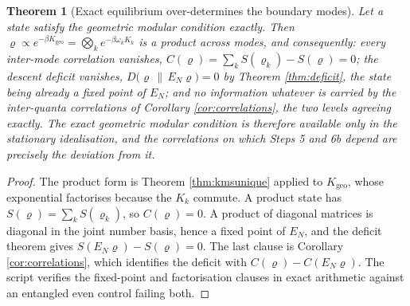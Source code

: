 \documentclass[11pt]{article}
\newtheorem{theorem}{Theorem}[section]
\theoremstyle{definition}
\newcommand{\EN}{E_{N}}
\newcommand{\rel}[2]{D\bigl(#1 \,\|\, #2\bigr)}
\begin{document}
\begin{theorem}[Exact equilibrium over-determines the boundary modes]\label{thm:overdet}
Let a state satisfy the geometric modular condition exactly. Then $\varrho \propto e^{-\beta K_{\mathrm{geo}}} = \bigotimes_k e^{-\beta\omega_k K_k}$ is a product across modes, and consequently: every inter-mode correlation vanishes, $C(\varrho) = \sum_k S(\varrho_k) - S(\varrho) = 0$; the descent deficit vanishes, $\rel{\varrho}{\EN\varrho} = 0$ by Theorem \ref{thm:deficit}, the state being already a fixed point of $\EN$; and no information whatever is carried by the inter-quanta correlations of Corollary \ref{cor:correlations}, the two levels agreeing exactly. The exact geometric modular condition is therefore available only in the stationary idealisation, and the correlations on which Steps 5 and 6b depend are precisely the deviation from it.
\end{theorem}

\begin{proof}
The product form is Theorem \ref{thm:kmsunique} applied to $K_{\mathrm{geo}}$, whose exponential factorises because the $K_k$ commute. A product state has $S(\varrho) = \sum_k S(\varrho_k)$, so $C(\varrho) = 0$. A product of diagonal matrices is diagonal in the joint number basis, hence a fixed point of $\EN$, and the deficit theorem gives $S(\EN\varrho) - S(\varrho) = 0$. The last clause is Corollary \ref{cor:correlations}, which identifies the deficit with $C(\varrho) - C(\EN\varrho)$. The script verifies the fixed-point and factorisation clauses in exact arithmetic against an entangled even control failing both.
\end{proof}
\end{document}
